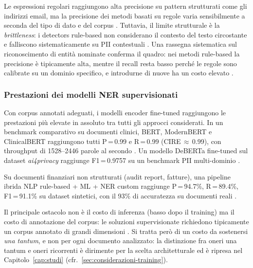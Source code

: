 Le espressioni regolari raggiungono alta precisione su pattern strutturati come gli indirizzi email, ma la precisione dei metodi basati su regole varia sensibilmente a seconda del tipo di dato e del corpus
\cite{elazarWhatsMyBigData2024}. %
Tuttavia, il limite strutturale è la \textit{brittleness}: i detectors rule-based non considerano il contesto del testo circostante e falliscono sistematicamente su PII contestuali
\cite{jiangGenerativeDataRefinement2025}. %
Una rassegna sistematica sul riconoscimento di entità nominate conferma il quadro: nei metodi rule-based la precisione è tipicamente alta, mentre il recall resta basso perché le regole sono calibrate su un dominio specifico, e introdurne di nuove ha un costo elevato \cite{keraghelRecentAdvancesNamed2024}. %

\subsubsection*{Prestazioni dei modelli NER supervisionati}

Con corpus annotati adeguati, i modelli encoder fine-tuned raggiungono le prestazioni più elevate in assoluto tra tutti gli approcci considerati. In un benchmark comparativo su documenti clinici, BERT, ModernBERT e ClinicalBERT raggiungono tutti P\,=\,0.99 e R\,=\,0.99 (CIRE\,$\approx$\,0.99), con throughput di 1528--2446 parole al secondo
\cite{zambareFairEfficientDeidentification2026}. %
Un modello DeBERTa fine-tuned sul dataset \textit{ai4privacy} raggiunge F1\,=\,0.9757 su un benchmark PII multi-dominio
\cite{DeBERTaai4privacy}. %

Su documenti finanziari non strutturati (audit report, fatture), una pipeline ibrida NLP rule-based + ML + NER custom raggiunge P\,=\,94.7\%, R\,=\,89.4\%, F1\,=\,91.1\% su dataset sintetici, con il 93\% di accuratezza su documenti reali
\cite{mishraHybridRulebasedNLP2025}. %

Il principale ostacolo non è il costo di inferenza (basso dopo il training) ma il costo di annotazione del corpus: le soluzioni supervisionate richiedono tipicamente un corpus annotato di grandi dimensioni
\cite{africanoPIIDetectionLowResource2024}. %
Si tratta però di un costo da sostenersi \emph{una tantum}, e non per ogni documento analizzato: la distinzione fra oneri una tantum e oneri ricorrenti è dirimente per la scelta architetturale ed è ripresa nel Capitolo~\ref{cap:studi} (cfr.~\ref{sec:considerazioni-training}).

